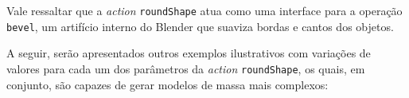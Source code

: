 Vale ressaltar que a \textit{action} \texttt{roundShape} atua como uma interface para a operação \texttt{bevel}, um artifício interno do Blender que suaviza bordas e cantos dos objetos.

\newpage

A seguir, serão apresentados outros exemplos ilustrativos com variações de valores para cada um dos parâmetros da \textit{action} \texttt{roundShape}, os quais, em conjunto, são capazes de gerar modelos de massa mais complexos:

\begin{figure}[ht!]
	\centering
	\captionsetup{width=15cm}
	{}	
\end{figure}

